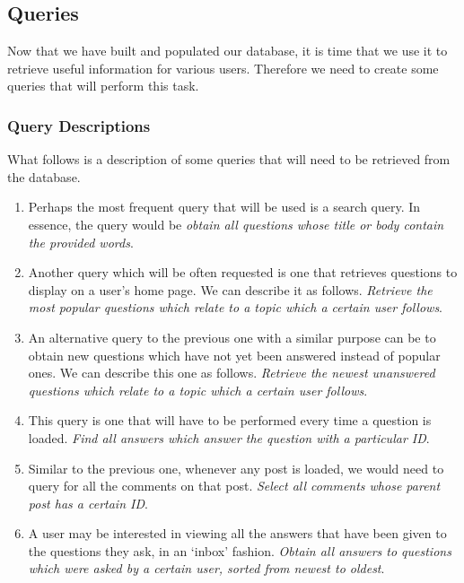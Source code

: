 \subsection{Queries}

Now that we have built and populated our database, it is time that we use it to retrieve useful information for various users. Therefore we need to create some queries that will perform this task.

\subsubsection{Query Descriptions}

What follows is a description of some queries that will need to be retrieved from the database.

\begin{enumerate}
	\item
	Perhaps the most frequent query that will be used is a search query. In essence, the query would be \emph{obtain all questions whose title or body contain the provided words}.

	\item
	Another query which will be often requested is one that retrieves questions to display on a user's home page. We can describe it as follows. \emph{Retrieve the most popular questions which relate to a topic which a certain user follows}.

	\item
	An alternative query to the previous one with a similar purpose can be to obtain new questions which have not yet been answered instead of popular ones. We can describe this one as follows. \emph{Retrieve the newest unanswered questions which relate to a topic which a certain user follows}.

	\item
	This query is one that will have to be performed every time a question is loaded. \emph{Find all answers which answer the question with a particular ID}.

	\item
	Similar to the previous one, whenever any post is loaded, we would need to query for all the comments on that post. \emph{Select all comments whose parent post has a certain ID}.

	\item
	A user may be interested in viewing all the answers that have been given to the questions they ask, in an `inbox' fashion. \emph{Obtain all answers to questions which were asked by a certain user, sorted from newest to oldest}.


\end{enumerate}
